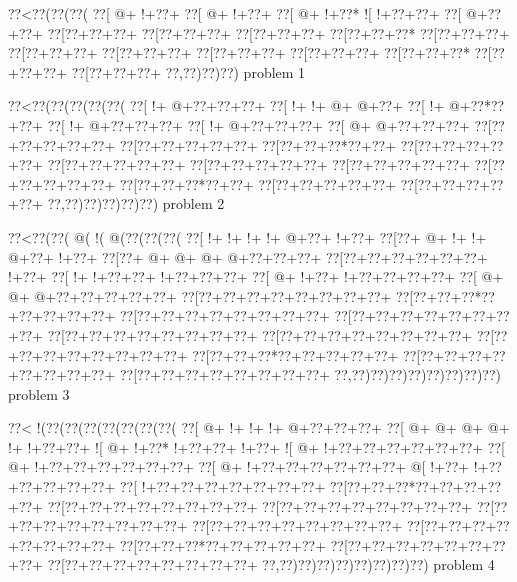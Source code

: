 \vbox{\vbox{\goo
\0??<\0??(\0??(\0??(
\0??[\- @+\- !+\0??+
\0??[\- @+\- !+\0??+
\0??[\- @+\- !+\0??*
\- ![\- !+\0??+\0??+
\0??[\- @+\0??+\0??+
\0??[\0??+\0??+\0??+
\0??[\0??+\0??+\0??+
\0??[\0??+\0??+\0??+
\0??[\0??+\0??+\0??*
\0??[\0??+\0??+\0??+
\0??[\0??+\0??+\0??+
\0??[\0??+\0??+\0??+
\0??[\0??+\0??+\0??+
\0??[\0??+\0??+\0??+
\0??[\0??+\0??+\0??*
\0??[\0??+\0??+\0??+
\0??[\0??+\0??+\0??+
\0??,\0??)\0??)\0??)
}
\hfil problem 1\hfil\break
}

\vbox{\vbox{\goo
\0??<\0??(\0??(\0??(\0??(\0??(
\0??[\- !+\- @+\0??+\0??+\0??+
\0??[\- !+\- !+\- @+\- @+\0??+
\0??[\- !+\- @+\0??*\0??+\0??+
\0??[\- !+\- @+\0??+\0??+\0??+
\0??[\- !+\- @+\0??+\0??+\0??+
\0??[\- @+\- @+\0??+\0??+\0??+
\0??[\0??+\0??+\0??+\0??+\0??+
\0??[\0??+\0??+\0??+\0??+\0??+
\0??[\0??+\0??+\0??*\0??+\0??+
\0??[\0??+\0??+\0??+\0??+\0??+
\0??[\0??+\0??+\0??+\0??+\0??+
\0??[\0??+\0??+\0??+\0??+\0??+
\0??[\0??+\0??+\0??+\0??+\0??+
\0??[\0??+\0??+\0??+\0??+\0??+
\0??[\0??+\0??+\0??*\0??+\0??+
\0??[\0??+\0??+\0??+\0??+\0??+
\0??[\0??+\0??+\0??+\0??+\0??+
\0??,\0??)\0??)\0??)\0??)\0??)
}
\hfil problem 2\hfil\break
}

\vbox{\vbox{\goo
\0??<\0??(\0??(\- @(\- !(\- @(\0??(\0??(\0??(
\0??[\- !+\- !+\- !+\- !+\- @+\0??+\- !+\0??+
\0??[\0??+\- @+\- !+\- !+\- @+\0??+\- !+\0??+
\0??[\0??+\- @+\- @+\- @+\- @+\0??+\0??+\0??+
\0??[\0??+\0??+\0??+\0??+\0??+\0??+\- !+\0??+
\0??[\- !+\- !+\0??+\0??+\- !+\0??+\0??+\0??+
\0??[\- @+\- !+\0??+\- !+\0??+\0??+\0??+\0??+
\0??[\- @+\- @+\- @+\0??+\0??+\0??+\0??+\0??+
\0??[\0??+\0??+\0??+\0??+\0??+\0??+\0??+\0??+
\0??[\0??+\0??+\0??*\0??+\0??+\0??+\0??+\0??+
\0??[\0??+\0??+\0??+\0??+\0??+\0??+\0??+\0??+
\0??[\0??+\0??+\0??+\0??+\0??+\0??+\0??+\0??+
\0??[\0??+\0??+\0??+\0??+\0??+\0??+\0??+\0??+
\0??[\0??+\0??+\0??+\0??+\0??+\0??+\0??+\0??+
\0??[\0??+\0??+\0??+\0??+\0??+\0??+\0??+\0??+
\0??[\0??+\0??+\0??*\0??+\0??+\0??+\0??+\0??+
\0??[\0??+\0??+\0??+\0??+\0??+\0??+\0??+\0??+
\0??[\0??+\0??+\0??+\0??+\0??+\0??+\0??+\0??+
\0??,\0??)\0??)\0??)\0??)\0??)\0??)\0??)\0??)
}
\hfil problem 3\hfil\break
}

\vbox{\vbox{\goo
\0??<\- !(\0??(\0??(\0??(\0??(\0??(\0??(\0??(
\0??[\- @+\- !+\- !+\- !+\- @+\0??+\0??+\0??+
\0??[\- @+\- @+\- @+\- @+\- !+\- !+\0??+\0??+
\- ![\- @+\- !+\0??*\- !+\0??+\0??+\- !+\0??+
\- ![\- @+\- !+\0??+\0??+\0??+\0??+\0??+\0??+
\0??[\- @+\- !+\0??+\0??+\0??+\0??+\0??+\0??+
\0??[\- @+\- !+\0??+\0??+\0??+\0??+\0??+\0??+
\- @[\- !+\0??+\- !+\0??+\0??+\0??+\0??+\0??+
\0??[\- !+\0??+\0??+\0??+\0??+\0??+\0??+\0??+
\0??[\0??+\0??+\0??*\0??+\0??+\0??+\0??+\0??+
\0??[\0??+\0??+\0??+\0??+\0??+\0??+\0??+\0??+
\0??[\0??+\0??+\0??+\0??+\0??+\0??+\0??+\0??+
\0??[\0??+\0??+\0??+\0??+\0??+\0??+\0??+\0??+
\0??[\0??+\0??+\0??+\0??+\0??+\0??+\0??+\0??+
\0??[\0??+\0??+\0??+\0??+\0??+\0??+\0??+\0??+
\0??[\0??+\0??+\0??*\0??+\0??+\0??+\0??+\0??+
\0??[\0??+\0??+\0??+\0??+\0??+\0??+\0??+\0??+
\0??[\0??+\0??+\0??+\0??+\0??+\0??+\0??+\0??+
\0??,\0??)\0??)\0??)\0??)\0??)\0??)\0??)\0??)
}
\hfil problem 4\hfil\break
}

